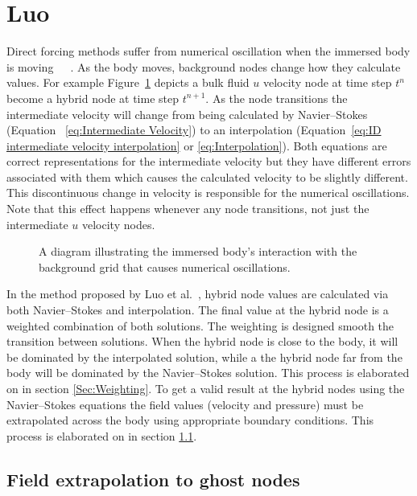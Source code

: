 \documentclass[onehalf,11pt]{beavtex}
\begin{document}
\section{Luo}

Direct forcing methods suffer from numerical oscillation when the immersed body is moving~\cite{Sotiropoulos:2014gv}~\cite{Mittal:2005ii}~\cite{liao2010simulating}.
As the body moves, background nodes change how they calculate values. 
For example Figure~\ref{fig:Temporal Discontinuity} depicts a bulk fluid $u$ velocity node at time step $t^n$ become a hybrid node at time step $t^{n+1}$.
As the node transitions the intermediate velocity will change from being calculated by Navier--Stokes (Equation ~\eqref{eq:Intermediate Velocity}) to an interpolation (Equation~\eqref{eq:ID intermediate velocity interpolation} or \eqref{eq:Interpolation}). 
Both equations are correct representations for the intermediate velocity but they have different errors associated with them which causes the calculated velocity to be slightly different. 
This discontinuous change in velocity is responsible for the numerical oscillations. 
Note that this effect happens whenever any node transitions, not just the intermediate $u$ velocity nodes.

\begin{figure}[!htb]
    \centering
    
    \caption{A diagram illustrating the immersed body's interaction with the background grid that causes numerical oscillations.}
    \label{fig:Temporal Discontinuity}
\end{figure}

In the method proposed by Luo et al.~\cite{Luo:2012gx}, hybrid node values are calculated via both Navier--Stokes and interpolation.
The final value at the hybrid node is a weighted combination of both solutions. 
The weighting is designed smooth the transition between solutions. 
When the hybrid node is close to the body, it will be dominated by the interpolated solution, while a the hybrid node far from the body will be dominated by the Navier--Stokes solution. 
This process is elaborated on in section \ref{Sec:Weighting}. 
To get a valid result at the hybrid nodes using the Navier--Stokes equations the field values (velocity and pressure) must be extrapolated across the body using appropriate boundary conditions. 
This process is elaborated on in section \ref{Sec:Field Extrapolation}. 


\subsection{Field extrapolation to ghost nodes}
\label{Sec:Field Extrapolation}
\end{document}
